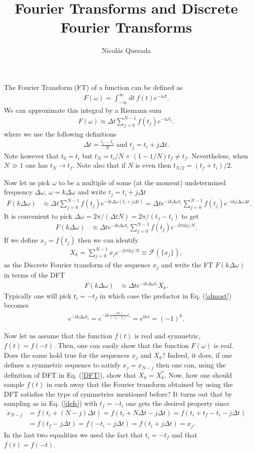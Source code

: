 \documentclass[english,12pt]{shreyasnotes}
\title{Fourier Transforms and Discrete Fourier Transforms}
\author{Nicol\'as Quesada}
\date{}
\newcommand{\ii}{\mathrm{i}}
\newcommand{\eq}[1]{\begin{align}#1\end{align}}
\begin{document}
\maketitle
The Fourier Transform (FT) of a function can be defined as
\eq{
F(\omega)=\int_{-\infty}^\infty dt \ f(t) e^{-\ii \omega t}.
}
We can approximate this integral by a Riemann sum
\eq{
F(\omega) \approx \Delta t \sum_{j=0}^{N-1} f(t_j) e^{-\ii \omega t_j}.
}
where we use the following definitions
\eq{\label{defs}
\Delta t=\frac{t_f-t_i}{N} \text{ and } t_j=t_i+j \Delta t.
}
Note however that $t_0=t_i$ but $t_N=t_i/N+(1-1/N) t_f \neq t_f$. Nevertheless, when $N \gg 1$ one has $t_N \to t_f$. Note also that if $N$ is even then $t_{N/2}=(t_f+t_i)/2$. 

Now let us pick $\omega$ to be a multiple of some (at the moment) undetermined frequency $\Delta \omega$, $\omega=k \Delta \omega$ and write $t_j=t_i+j \Delta t$
\eq{
F(k \Delta \omega)&\approx \Delta t\sum_{j=0}^{N-1} f(t_j) e^{-\ii k \Delta \omega (t_i+j \Delta t)}=\Delta t e^{-\ii k \Delta \omega t_i}\sum_{j=0}^{N-1} f(t_j) e^{-\ii k j \Delta \omega  \Delta t}.
}
It is convenient to pick $\Delta \omega = 2 \pi/(\Delta t N)=2 \pi /(t_f-t_i)$ to get
\eq{\label{almost}
F(k \Delta \omega)&\approx \Delta t e^{-\ii k \Delta \omega t_i}\sum_{j=0}^{N-1} f(t_j) e^{-2 \pi \ii k  j/N}.
}
If we define $x_j=f(t_j)$ then we can identify
\eq{\label{DFT}
X_k=\sum_{j=0}^{N-1} x_j e^{-2 \pi \ii k  j/N}\equiv \mathcal{F}\left(\{x_j \}\right),
}
as the Discrete Fourier transform of the sequence $x_j$ and write the FT  $F(k \Delta \omega)$ in terms of the DFT
\eq{\label{quasi}
F(k \Delta \omega)&\approx \Delta t e^{-\ii k \Delta \omega t_i} X_k.
}
Typically one will pick $t_i=-t_f$ in which case the prefactor in Eq. (\ref{almost}) becomes
\eq{
e^{-\ii k \Delta \omega t_i}=e^{-\ii k \frac{(2 \pi)}{(-t_i-t_i)} t_i}=e^{\ii k \pi}=(-1)^k.
}

Now let us assume that the function $f(t)$ is real and symmetric, $f(t)=f(-t)$. Then, one can easily show that the function $F(\omega)$ is real. Does the same hold true for the sequences $x_j$ and $X_k$? Indeed, it does, if one defines a symmetric sequence to satisfy $x_j=x_{N-j}$ then one can, using the definition of DFT in Eq. (\ref{DFT}), show that $X_k=X_k^*$. Now, how one should sample $f(t)$ in such away that the Fourier transform obtained by using the DFT satisfies the type of symmetries mentioned before?
It turns out that by sampling as in Eq. (\ref{defs}) with $t_f=-t_i$ one gets the desired property since
\eq{
x_{N-j}&=f(t_i+(N-j)\Delta t)=f(t_i+N\Delta t-j\Delta t)=f(t_i+t_f-t_i-j \Delta t  )\\
&=f(t_f-j\Delta t )=f(-t_i-j \Delta t )=f(t_i+j \Delta t )=x_j. \nonumber
}
In the last two equalities we used the fact that $t_i=-t_f$ and that $f(t)=f(-t)$.
\end{document}
